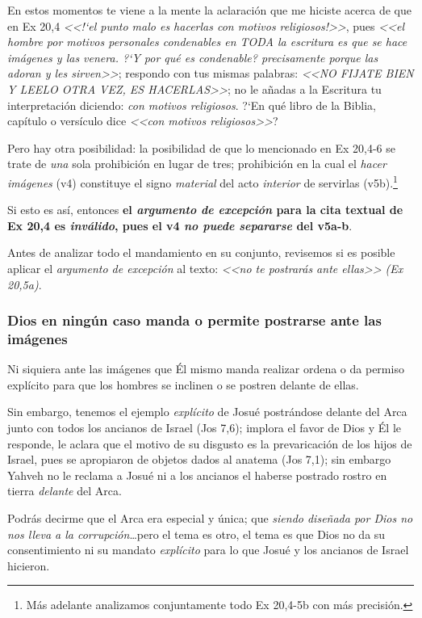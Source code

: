 \documentclass{article}
\begin{document}
En estos momentos te viene a la mente la aclaraci\'on que me hiciste acerca de que en Ex 20,4 \emph{<<!`el punto malo es hacerlas con motivos religiosos!>>}, pues \emph{<<el hombre por motivos personales condenables en TODA la escritura es que se hace imágenes y las venera. ?`Y por qu\'e es condenable? precisamente porque las adoran y les sirven>>}; respondo con tus mismas palabras: \emph{<<NO FIJATE BIEN Y LEELO OTRA VEZ, ES HACERLAS>>}; no le a\~nadas a la Escritura tu interpretaci\'on diciendo: \emph{con motivos religiosos}. ?`En qu\'e libro de la Biblia, cap\'{i}tulo o vers\'{i}culo dice \emph{<<con motivos religiosos>>}?

Pero hay otra posibilidad: la posibilidad de que lo mencionado en Ex 20,4-6 se trate de \emph{una} sola prohibici\'on en lugar de tres; prohibici\'on en la cual el \emph{hacer im\'agenes} (v4) constituye el signo \emph{material} del acto \emph{interior} de servirlas (v5b).\footnote{M\'as adelante analizamos conjuntamente todo Ex 20,4-5b con m\'as precisi\'on.}

Si esto es as\'{i}, entonces \textbf{el \emph{argumento de excepci\'on} para la cita textual de Ex 20,4 es \emph{inv\'alido}, pues el v4 \emph{no puede separarse} del v5a-b}.

Antes de analizar todo el mandamiento en su conjunto, revisemos si es posible aplicar el \emph{argumento de excepci\'on} al texto: \emph{<<no te postrar\'as ante ellas>> (Ex 20,5a)}.

\subsubsection{Dios en ning\'un caso manda o permite postrarse ante las im\'agenes}

Ni siquiera ante las im\'agenes que \'El mismo manda realizar ordena o da permiso expl\'{i}cito para que los hombres se inclinen o se postren delante de ellas.

Sin embargo, tenemos el ejemplo \emph{expl\'{i}cito} de Josu\'e postr\'andose delante del Arca junto con todos los ancianos de Israel (Jos 7,6); implora el favor de Dios y \'El le responde, le aclara que el motivo de su disgusto es la prevaricaci\'on de los hijos de Israel, pues se apropiaron de objetos dados al anatema (Jos 7,1); sin embargo Yahveh no le reclama a Josu\'e ni a los ancianos el haberse postrado rostro en tierra \emph{delante} del Arca.

Podr\'as decirme que el Arca era especial y \'unica; que \emph{siendo dise\~nada por Dios no nos lleva a la corrupci\'on}\ldots pero el tema es otro, el tema es que Dios no da su consentimiento ni su mandato \emph{expl\'{i}cito} para lo que Josu\'e y los ancianos de Israel hicieron.
\end{document}
